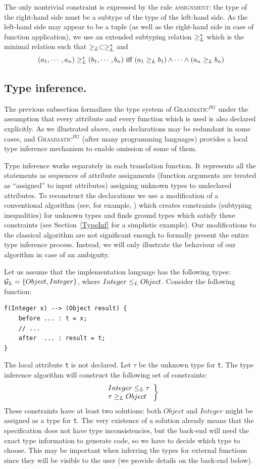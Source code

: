 \documentclass{informat} %
\newcommand{\secref}[1]{Section~\ref{#1}}
\newcommand{\ATF}{\textsc{Grammatic}$^{PG}$}
\begin{document}
The only nontrivial constraint is expressed by the rule \textsc{assignment}: the type of the right-hand side must be a subtype of the type of the left-hand side. As the left-hand side may appear to be a tuple (as well as the right-hand side in case of function application), we use an extended subtyping relation $\ge_L^*$ which is the minimal relation such that $\ge_L \subset \ge_L^*$ and
$$(a_1,\cdots,a_n)\ge_L^*(b_1,\cdots,b_n)\mbox{ iff } (a_1 \ge_L b_1) \wedge \cdots \wedge (a_n \ge_L b_n)$$


\subsection{Type inference.}\label{TypeInference}

The previous subsection formalizes the type system of \ATF{} under the assumption that every attribute and every function which is used is also declared explicitly. As we illustrated above, such declarations may be redundant in some cases, and \ATF{} (after many programming languages) provides a local type inference mechanism to enable omission of some of them.  

Type inference works separately in each translation function. It represents all the statements as sequences of attribute assignments (function arguments are treated as ``assigned'' to input attributes) assigning unknown types to undeclared attributes. To reconstruct the declarations we use a modification of a conventional algorithm (see, for example, \cite{Pierce}) which creates constraints (subtyping inequalities) for unknown types and finds ground types which satisfy these constraints (see \secref{TypeInf} for a simplistic example). Our modifications to the classical algorithm are not significant enough to formally present the entire type inference process. Instead, we will only illustrate the behaviour of our algorithm in case of an ambiguity.

Let us assume that the implementation language has the following types: ${\mathcal{G}_L} = \{Object, Integer\}$, where $Integer \le_L Object$. Consider the following function:
\begin{lstlisting}[language=Grammatic]
f(Integer x) --> (Object result) {
	before ... : t = x;
	// ...
	after  ... : result = t;
}
\end{lstlisting}
The local attribute \texttt{t} is not declared. Let $\tau$ be the unknown type for \texttt{t}. The type inference algorithm will construct the following set of constraints:
$$\left.\begin{array}{l}
Integer \le_L \tau\\
\tau \ge_L Object\\
\end{array}\right\}$$
These constraints have at least two solutions: both $Object$ and $Integer$ might be assigned as a type for \texttt{t}. The very existence of a solution already means that the specification does not have type inconsistencies, but the back-end will need the exact type information to generate code, so we have to decide which type to choose. This may be important when inferring the types for external functions since they will be visible to the user (we provide details on the back-end below).
\end{document}
